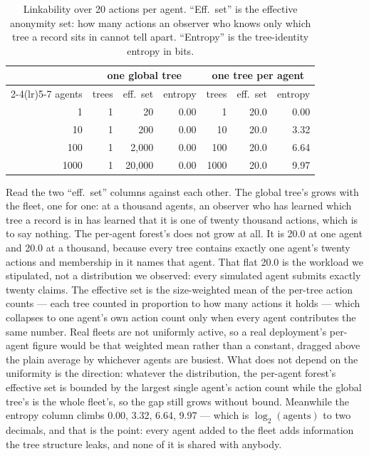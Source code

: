 \documentclass[11pt]{article}
\begin{document}
\begin{table}[htbp]
\centering
\small
\begin{tabular}{r rrr rrr}
\toprule
& \multicolumn{3}{c}{one global tree} & \multicolumn{3}{c}{one tree per agent} \\
\cmidrule(lr){2-4}\cmidrule(lr){5-7}
agents & trees & eff.\ set & entropy & trees & eff.\ set & entropy \\
\midrule
1    & 1 & 20      & 0.00 & 1    & 20.0 & 0.00 \\
10   & 1 & 200     & 0.00 & 10   & 20.0 & 3.32 \\
100  & 1 & 2{,}000  & 0.00 & 100  & 20.0 & 6.64 \\
1000 & 1 & 20{,}000 & 0.00 & 1000 & 20.0 & 9.97 \\
\bottomrule
\end{tabular}
\caption{Linkability over 20 actions per agent. ``Eff.\ set'' is the effective
anonymity set: how many actions an observer who knows only which tree a record
sits in cannot tell apart. ``Entropy'' is the tree-identity entropy in bits.}
\label{tab:link}
\end{table}

Read the two ``eff.\ set'' columns against each other. The global tree's grows
with the fleet, one for one: at a thousand agents, an observer who has learned
which tree a record is in has learned that it is one of twenty thousand
actions, which is to say nothing. The per-agent forest's does not grow at all.
It is 20.0 at one agent and 20.0 at a thousand, because every tree contains
exactly one agent's twenty actions and membership in it names that agent.
That flat 20.0 is the workload we stipulated, not a distribution we observed:
every simulated agent submits exactly twenty claims. The effective set is the
size-weighted mean of the per-tree action counts --- each tree counted in
proportion to how many actions it holds --- which collapses to one agent's own
action count only when every agent contributes the same number. Real fleets are not uniformly active, so a real deployment's per-agent
figure would be that weighted mean rather than a constant, dragged above the
plain average by whichever agents are busiest. What does not depend on the
uniformity is the
direction: whatever the distribution, the per-agent forest's effective set is
bounded by the largest single agent's action count while the global tree's is
the whole fleet's, so the gap still grows without bound.
Meanwhile the entropy column climbs 0.00, 3.32, 6.64, 9.97 --- which is
$\log_2(\text{agents})$ to two decimals, and that is the point: every agent
added to the fleet adds information the tree structure leaks, and none of it is
shared with anybody.
\end{document}
